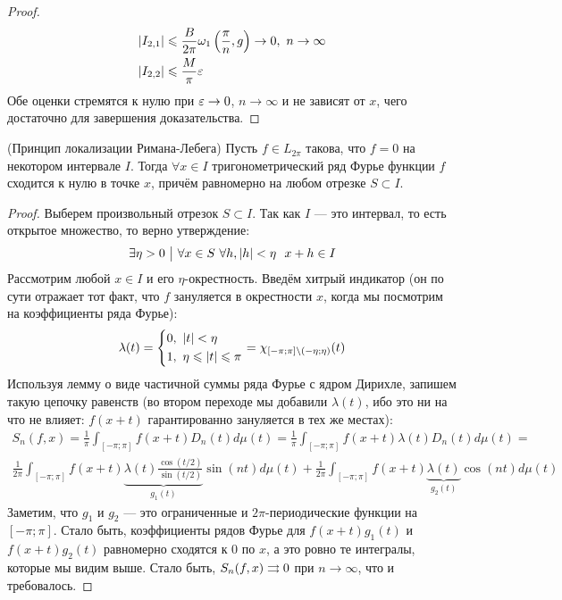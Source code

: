 \begin{proof}
	\begin{align*}
		&{|I_{2, 1}| \leqslant \frac{B}{2\pi} \omega_1\left(\frac{\pi}{n}, g\right) \to 0,\ n \to \infty}
		\\
		&{|I_{2, 2}| \leqslant \frac{M}{\pi}\varepsilon}
	\end{align*}
	Обе оценки стремятся к нулю при $\varepsilon \to 0$, $n \to \infty$ и не зависят от $x$, чего достаточно для завершения доказательства.
\end{proof}

\begin{theorem} (Принцип локализации Римана-Лебега)
	Пусть $f \in L_{2\pi}$ такова, что $f = 0$ на некотором интервале $I$. Тогда $\forall x \in I$ тригонометрический ряд Фурье функции $f$ сходится к нулю в точке $x$, причём равномерно на любом отрезке $S \subset I$.
\end{theorem}

\begin{proof}
	Выберем произвольный отрезок $S \subset I$. Так как $I$ --- это интервал, то есть открытое множество, то верно утверждение:
	\[
		\exists \eta > 0 \such \forall x \in S\ \forall h, |h| < \eta\ \ x + h \in I
	\]
	Рассмотрим любой $x \in I$ и его $\eta$-окрестность. Введём хитрый индикатор (он по сути отражает тот факт, что $f$ зануляется в окрестности $x$, когда мы посмотрим на коэффициенты ряда Фурье):
	\[
		\lambda(t) = \left\{ \begin{aligned} 
			&{0,\ |t| < \eta}
			\\
			&{1,\ \eta \leqslant |t| \leqslant \pi}
		 \end{aligned} \right.
		= \chi_{[-\pi; \pi] \backslash (-\eta; \eta)}(t)
	\]
	Используя лемму о виде частичной суммы ряда Фурье с ядром Дирихле, запишем такую цепочку равенств (во втором переходе мы добавили $\lambda(t)$, ибо это ни на что не влияет: $f(x + t)$ гарантированно зануляется в тех же местах):
	\begin{multline*}
		S_n(f, x) = \frac{1}{\pi} \int_{[-\pi; \pi]} f(x + t)D_n(t)d\mu(t) = \frac{1}{\pi} \int_{[-\pi; \pi]} f(x + t)\lambda(t)D_n(t)d\mu(t) =
		\\
		\frac{1}{2\pi} \int_{[-\pi; \pi]} f(x + t)\underbrace{\lambda(t) \frac{\cos(t / 2)}{\sin(t / 2)}}_{g_1(t)}\sin(nt)d\mu(t) + \frac{1}{2\pi} \int_{[-\pi; \pi]} f(x + t)\underbrace{\lambda(t)}_{g_2(t)}\cos(nt)d\mu(t)
	\end{multline*}
	Заметим, что $g_1$ и $g_2$ --- это ограниченные и $2\pi$-периодические функции на $[-\pi; \pi]$. Стало быть, коэффициенты рядов Фурье для $f(x + t)g_1(t)$ и $f(x + t)g_2(t)$ равномерно сходятся к 0 по $x$, а это ровно те интегралы, которые мы видим выше. Стало быть, $S_n(f, x) \rightrightarrows 0$ при $n \to \infty$, что и требовалось.
\end{proof}

